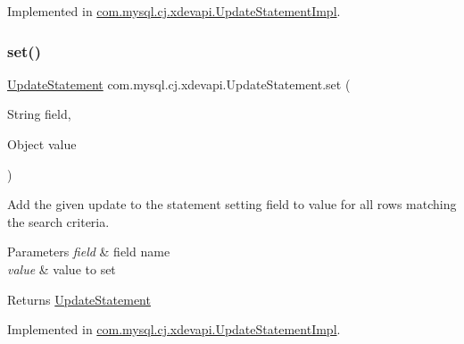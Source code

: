 Implemented in \mbox{\hyperlink{classcom_1_1mysql_1_1cj_1_1xdevapi_1_1_update_statement_impl_ad3e9fc6db7805042b6f73938782c2173}{com.\+mysql.\+cj.\+xdevapi.\+Update\+Statement\+Impl}}.

\mbox{\label{interfacecom_1_1mysql_1_1cj_1_1xdevapi_1_1_update_statement_a01e50a32f4bf89c98b112b7e22a6f140}} 
\subsubsection{\texorpdfstring{set()}{set()}\hspace{0.1cm}{\footnotesize\ttfamily [2/2]}}
{\footnotesize\ttfamily \mbox{\hyperlink{interfacecom_1_1mysql_1_1cj_1_1xdevapi_1_1_update_statement}{Update\+Statement}} com.\+mysql.\+cj.\+xdevapi.\+Update\+Statement.\+set (\begin{DoxyParamCaption}\item[{String}]{field,  }\item[{Object}]{value }\end{DoxyParamCaption})}

Add the given update to the statement setting field to value for all rows matching the search criteria.


\begin{DoxyParams}{Parameters}
{\em field} & field name \\
\hline
{\em value} & value to set \\
\hline
\end{DoxyParams}
\begin{DoxyReturn}{Returns}
\mbox{\hyperlink{interfacecom_1_1mysql_1_1cj_1_1xdevapi_1_1_update_statement}{Update\+Statement}} 
\end{DoxyReturn}


Implemented in \mbox{\hyperlink{classcom_1_1mysql_1_1cj_1_1xdevapi_1_1_update_statement_impl_a6100d1574e2958c9aa1229e70a476e37}{com.\+mysql.\+cj.\+xdevapi.\+Update\+Statement\+Impl}}.

\mbox{\label{interfacecom_1_1mysql_1_1cj_1_1xdevapi_1_1_update_statement_a930a2d5be11f037550eef14968313206}} 
